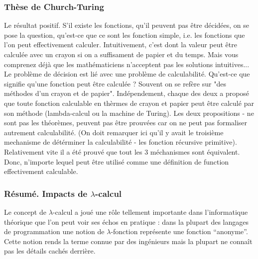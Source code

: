 \documentclass[12pt, a4paper]{article}
\begin{document}
\subsubsection*{Thèse de Church-Turing}
Le résultat positif.
S'il existe les fonctions, qu'il peuvent pas être décidées, on se pose la question, qu'est-ce que ce sont les fonction simple, i.e. les fonctions que l'on peut effectivement calculer.
Intuitivement, c'est dont la valeur peut être calculée avec un crayon si on a suffisament de papier et du temps.
Mais vous comprenez déjà que les mathématiciens n'acceptent pas les solutions intuitives...
Le problème de décision est lié avec une problème de calculabilité. Qu'est-ce que signifie qu'une fonction peut être calculée ? Souvent on se refère sur "des méthodes d'un crayon et de papier". Indépendement, chaque des deux a proposé que toute fonction calculable en thèrmes de crayon et papier peut être calculé par son méthode (lambda-calcul ou la machine de Turing). Les deux propositions - ne sont pas les théorèmes, peuvent pas être prouvées car on ne peut pas formaliser autrement calculabilité. (On doit remarquer ici qu'il y avait le troisième mechanisme de détérminer la calculabilité - les fonction récursive primitive). Relativement vite il a été prouvé que tout les 3 méchanismes sont équivalent. Donc, n'importe lequel peut être utilisé comme une définition de function effectivement calculable.

\subsubsection*{Résumé. Impacts de $\lambda$-calcul}
Le concept de $\lambda$-calcul a joué une rôle tellement importante dans l'informatique théorique que l'on peut voir ses échos en pratique : dans la plupart des langages de programmation une notion de $\lambda$-fonction représente une fonction ``anonyme''.
Cette notion rends la terme connue par des ingénieurs mais la plupart ne connaît pas les détails cachés derrière.
\end{document}
